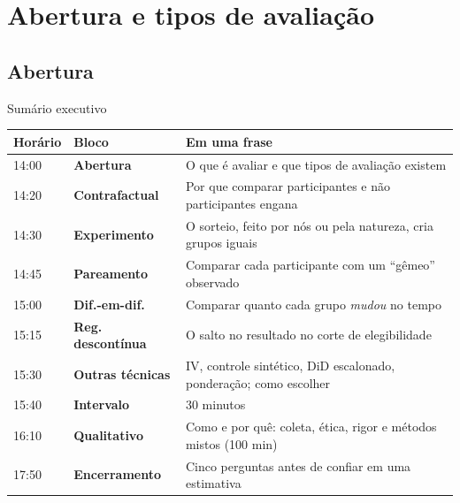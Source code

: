 \section[Abertura]{Abertura e tipos de avaliação}
\subsection{Abertura}

\begin{frame}{Sumário executivo}
  \scriptsize
  \renewcommand{\arraystretch}{1.12}
  \begin{tabularx}{\textwidth}{@{}l>{\bfseries}lX@{}}
    \toprule
    \textbf{Horário} & \textbf{Bloco} & \textbf{Em uma frase} \\ \midrule
    14:00 & Abertura & O que é avaliar e que tipos de avaliação existem \\
    14:20 & Contrafactual & Por que comparar participantes e não participantes engana \\
    14:30 & Experimento & O sorteio, feito por nós ou pela natureza, cria grupos iguais \\
    14:45 & Pareamento & Comparar cada participante com um ``gêmeo'' observado \\
    15:00 & Dif.-em-dif. & Comparar quanto cada grupo \emph{mudou} no tempo \\
    15:15 & Reg. descontínua & O salto no resultado no corte de elegibilidade \\
    15:30 & Outras técnicas & IV, controle sintético, DiD escalonado, ponderação; como escolher \\
    \rowcolor{laranjaclaro}
    15:40 & Intervalo & 30 minutos \\
    16:10 & Qualitativo & Como e por quê: coleta, ética, rigor e métodos mistos (100 min) \\
    17:50 & Encerramento & Cinco perguntas antes de confiar em uma estimativa \\ \bottomrule
  \end{tabularx}
\end{frame}

